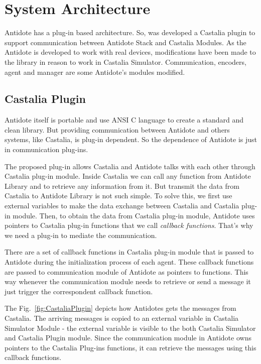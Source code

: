 \section{System Architecture}\label{systemarch}

Antidote has a plug-in based architecture. So, was developed a Castalia plugin to support communication between Antidote Stack and Castalia Modules. As the Antidote is developed to work with real devices, modifications have been made to the library in reason to work in Castalia Simulator. Communication, encoders, agent and manager are some Antidote's modules modified.

\subsection{Castalia Plugin}

Antidote itself is portable and use ANSI C language to create a standard and clean library. But providing communication between Antidote and others systems, like Castalia, is plug-in dependent. So the dependence of Antidote is just in communication plug-ins.

The proposed plug-in allows Castalia and Antidote talks with each other through Castalia plug-in module. Inside Castalia we can call any function from Antidote Library and to retrieve any information from it. But transmit the data from Castalia to Antidote Library is not such simple. To solve this, we first use external variables to make the data exchange between Castalia and Castalia plug-in module. Then, to obtain the data from Castalia plug-in module, Antidote uses pointers to Castalia plug-in functions that we call \textit{callback functions}. That's why we need a plug-in to mediate the communication. 

There are a set of callback functions in Castalia plug-in module that is passed to Antidote during the initialization process of each agent. These callback functions are passed to communication module of Antidote as pointers to functions. This way whenever the communication module needs to retrieve or send a message it just trigger the correspondent callback function. 

The Fig.~\ref{fig:CastaliaPlugin} depicts how Antidotes gets the messages from Castalia. The arriving messages is copied to an external variable in Castalia Simulator Module - the external variable is visible to the both Castalia Simulator and Castalia Plugin module. Since the communication module in Antidote owns pointers to the Castalia Plug-ins functions, it can retrieve the messages using this callback functions.

